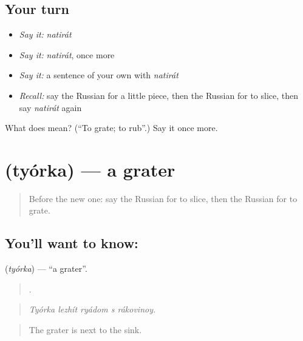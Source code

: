 \subsection*{Your turn}
\begin{itemize}
\raggedright
  \item \emph{Say it:} \emph{natirát}
  \item \emph{Say it:} \emph{natirát}, once more
  \item \emph{Say it:} a sentence of your own with \emph{natirát}
  \item \emph{Recall:} say the Russian for a little piece, then the Russian for to slice, then say \emph{natirát} again
\end{itemize}

\begin{tcolorbox}[breakable,colback=teal!4,colframe=teal!35!black,title={Before you move on}]
What does  mean? (\textquotedblleft{}To grate; to rub\textquotedblright{}.) Say it once more.
\end{tcolorbox}
\section[\texorpdfstring{\ru{тёрка} (tyórka)}{тёрка (tyórka)}]{ (tyórka) — a grater}

\label{lesson:RU-C328-tyorka}



\begin{quote}
Before the new one: say the Russian for to slice, then the Russian for to grate.
\end{quote}

\subsection*{You'll want to know: }
\textbf{} (\emph{tyórka}) — \textquotedblleft{}a grater\textquotedblright{}.

\begin{quote}
    .
\end{quote}

\begin{quote}
\emph{Tyórka lezhít ryádom s rákovinoy.}
\end{quote}

\begin{quote}
The grater is next to the sink.
\end{quote}

